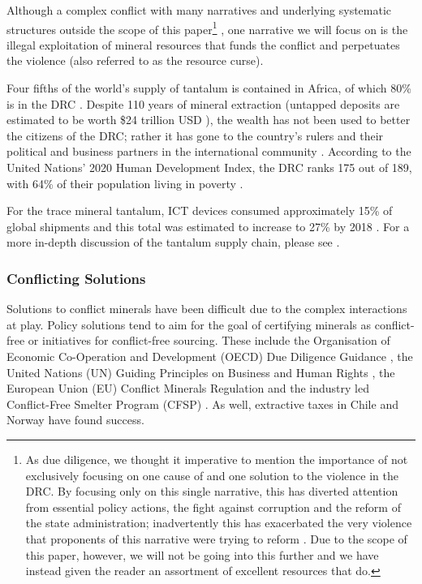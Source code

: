 \documentclass{article}
\begin{document}
Although a complex conflict with many narratives and underlying systematic structures outside the scope of this paper\footnote{As due diligence, we thought it imperative to mention the importance of not exclusively focusing on one cause of and one solution to the violence in the DRC. By focusing only on this single narrative, this has diverted attention from essential policy actions, the fight against corruption and the reform of the state administration; inadvertently this has exacerbated the very violence that proponents of this narrative were trying to reform \cite{autesserre2012dangerous}. Due to the scope of this paper, however, we will not be going into this further and we have instead given the reader an assortment of excellent resources that do.}
\cite{autesserre2012dangerous, alorse2015assessing, grant2015new}, one narrative we will focus on is the illegal exploitation of mineral resources that funds the conflict and perpetuates the violence (also referred to as the resource curse).

Four fifths of the world's supply of tantalum is contained in Africa, of which 80\% is in the DRC \cite{nzongola2002congo, montague2002stolen}. Despite 110 years of mineral extraction (untapped deposits are estimated to be worth \$24 trillion USD \cite{cfr2021congoconflict}), the wealth has not been used to better the citizens of the DRC; rather it has gone to the country's rulers and their political and business partners in the international community \cite{nzongola2002congo}. According to the United Nations' 2020 Human Development Index, the DRC ranks 175 out of 189, with 64\% of their population living in poverty \cite{unitednations2020hdr}.

For the trace mineral tantalum, ICT devices consumed approximately 15\% of global shipments and this total was estimated to increase to 27\% by 2018 \cite{fitzpatrick2015conflict}. For a more in-depth discussion of the tantalum supply chain, please see \cite{mancheri2018resilience}.


\subsubsection{Conflicting Solutions}
Solutions to conflict minerals have been difficult due to the complex interactions at play. Policy solutions tend to aim for the goal of certifying minerals as conflict-free or initiatives for conflict-free sourcing. These include the Organisation of Economic Co-Operation and Development (OECD) Due Diligence Guidance \cite{oced2016duediligence}, the United Nations (UN) Guiding Principles on Business and Human Rights \cite{un2011guidingprinciples}, the European Union (EU) Conflict Minerals Regulation \cite{ec2020duediligence} and the industry led Conflict-Free Smelter Program (CFSP) \cite{cfsi2016cfsp}. As well, extractive taxes in Chile \cite{anrc2016chilecasestudy} and Norway \cite{lund2014state} have found success.
\end{document}
